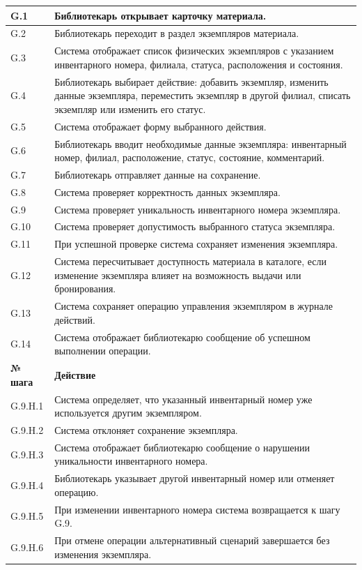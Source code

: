 \documentclass[12pt,a4paper]{article}
\begin{document}
\begin{xltabular}{\textwidth}{
				|>{\raggedright\arraybackslash}p{2.7cm}
				|>{\raggedright\arraybackslash}X|
			}
			G.1 & Библиотекарь открывает карточку материала. \\
			\hline
			G.2 & Библиотекарь переходит в раздел экземпляров материала. \\
			\hline
			G.3 & Система отображает список физических экземпляров с указанием
			инвентарного номера, филиала, статуса, расположения и состояния. \\
			\hline
			G.4 & Библиотекарь выбирает действие: добавить экземпляр, изменить данные
			экземпляра, переместить экземпляр в другой филиал, списать экземпляр
			или изменить его статус. \\
			\hline
			G.5 & Система отображает форму выбранного действия. \\
			\hline
			G.6 & Библиотекарь вводит необходимые данные экземпляра: инвентарный номер,
			филиал, расположение, статус, состояние, комментарий. \\
			\hline
			G.7 & Библиотекарь отправляет данные на сохранение. \\
			\hline
			G.8 & Система проверяет корректность данных экземпляра. \\
			\hline
			G.9 & Система проверяет уникальность инвентарного номера экземпляра. \\
			\hline
			G.10 & Система проверяет допустимость выбранного статуса экземпляра. \\
			\hline
			G.11 & При успешной проверке система сохраняет изменения экземпляра. \\
			\hline
			G.12 & Система пересчитывает доступность материала в каталоге, если изменение
			экземпляра влияет на возможность выдачи или бронирования. \\
			\hline
			G.13 & Система сохраняет операцию управления экземпляром в журнале действий. \\
			\hline
			G.14 & Система отображает библиотекарю сообщение об успешном выполнении
			операции. \\
			\hline
			
			
			\textbf{№ шага} & \textbf{Действие} \\
			\hline
			
			G.9.H.1 & Система определяет, что указанный инвентарный номер уже используется
			другим экземпляром. \\
			\hline
			G.9.H.2 & Система отклоняет сохранение экземпляра. \\
			\hline
			G.9.H.3 & Система отображает библиотекарю сообщение о нарушении уникальности
			инвентарного номера. \\
			\hline
			G.9.H.4 & Библиотекарь указывает другой инвентарный номер или отменяет
			операцию. \\
			\hline
			G.9.H.5 & При изменении инвентарного номера система возвращается к шагу G.9. \\
			\hline
			G.9.H.6 & При отмене операции альтернативный сценарий завершается без изменения
			экземпляра. \\
			\hline
			

\end{xltabular}
\end{document}
